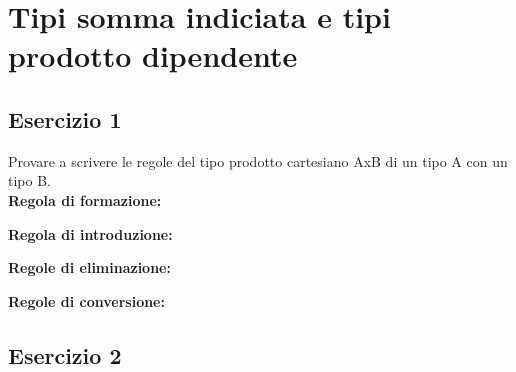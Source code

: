 \newpage
\section{Tipi somma indiciata e tipi prodotto dipendente}

\subsection{Esercizio 1}

Provare a scrivere le regole del tipo prodotto cartesiano AxB di un tipo A con
un tipo B. \\

\textbf{Regola di formazione:}

\begin{prooftree}
\end{prooftree}

\textbf{Regola di introduzione:}

\begin{prooftree}
\end{prooftree}

\textbf{Regole di eliminazione:}

\begin{prooftree}
\end{prooftree}

\begin{prooftree}
\end{prooftree}

\textbf{Regole di conversione:}

\begin{prooftree}
\end{prooftree}

\begin{prooftree}
\end{prooftree}

\subsection{Esercizio 2}


